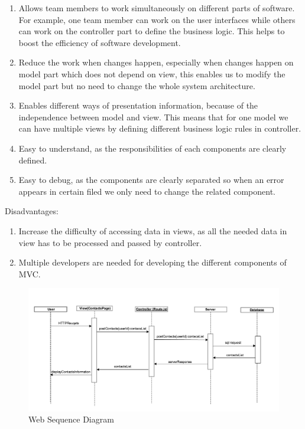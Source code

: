\documentclass{article}
\begin{document}
\begin{enumerate}
		\begin{enumerate}
			\item 
			Allows team members to work simultaneously on different parts of software. For example, one team member can work on the user interfaces while others can work on the controller part to define the business logic. This helps to boost the efficiency of software development.
			\item
			Reduce the work when changes happen, especially when changes happen on model part which does not depend on view, this enables us to modify the model part but no need to change the whole system architecture.
			\item
			Enables different ways of presentation information, because of the independence between model and view. This means that for one model we can have multiple views by defining different business logic rules in controller.
			\item
			Easy to understand, as the responsibilities of each components are clearly defined.
			\item
			Easy to debug, as the components are clearly separated so when an error appears in certain filed we only need to change the related component.
		\end{enumerate}
		
		Disadvantages: 
		
		\begin{enumerate}
			\item 
			Increase the difficulty of accessing data in views, as all the needed data in view has to be processed and passed by controller.
			
			\item
			Multiple developers are needed for developing the different components of MVC.
		\end{enumerate}
		
		\begin{figure}[H]
			\centering
			\includegraphics[scale=0.2]{web_sequence_diagram.png}
			\caption{Web Sequence Diagram}
		\end{figure}
		

\end{enumerate}
\end{document}
